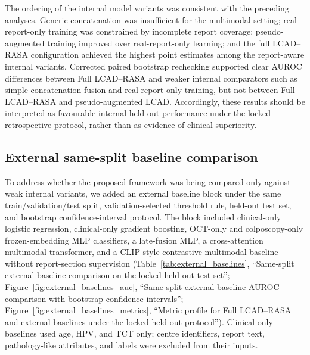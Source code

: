 The ordering of the internal model variants was consistent with the preceding analyses. Generic concatenation was insufficient for the multimodal setting; real-report-only training was constrained by incomplete report coverage; pseudo-augmented training improved over real-report-only learning; and the full LCAD--RASA configuration achieved the highest point estimates among the report-aware internal variants. Corrected paired bootstrap rechecking supported clear AUROC differences between Full LCAD--RASA and weaker internal comparators such as simple concatenation fusion and real-report-only training, but not between Full LCAD--RASA and pseudo-augmented LCAD. Accordingly, these results should be interpreted as favourable internal held-out performance under the locked retrospective protocol, rather than as evidence of clinical superiority.

\subsection{External same-split baseline comparison}
\label{subsec:external_baseline_results}

To address whether the proposed framework was being compared only against weak internal variants, we added an external baseline block under the same train/validation/test split, validation-selected threshold rule, held-out test set, and bootstrap confidence-interval protocol. The block included clinical-only logistic regression, clinical-only gradient boosting, OCT-only and colposcopy-only frozen-embedding MLP classifiers, a late-fusion MLP, a cross-attention multimodal transformer, and a CLIP-style contrastive multimodal baseline without report-section supervision (Table~\ref{tab:external_baselines}, ``Same-split external baseline comparison on the locked held-out test set''; Figure~\ref{fig:external_baselines_auc}, ``Same-split external baseline AUROC comparison with bootstrap confidence intervals''; Figure~\ref{fig:external_baselines_metrics}, ``Metric profile for Full LCAD--RASA and external baselines under the locked held-out protocol''). Clinical-only baselines used age, HPV, and TCT only; centre identifiers, report text, pathology-like attributes, and labels were excluded from their inputs.

